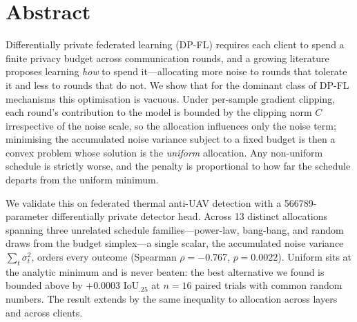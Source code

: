 %
%

\chapter*{Abstract}

Differentially private federated learning (DP-FL) requires each client to spend a
finite privacy budget across communication rounds, and a growing literature
proposes learning \emph{how} to spend it---allocating more noise to rounds that
tolerate it and less to rounds that do not. We show that for the dominant class
of DP-FL mechanisms this optimisation is vacuous. Under per-sample gradient
clipping, each round's contribution to the model is bounded by the clipping norm
$C$ irrespective of the noise scale, so the allocation influences only the noise
term; minimising the accumulated noise variance subject to a fixed budget is then
a convex problem whose solution is the \emph{uniform} allocation. Any non-uniform
schedule is strictly worse, and the penalty is proportional to how far the
schedule departs from the uniform minimum.

We validate this on federated thermal anti-UAV detection with a
\num{566789}-parameter differentially private detector head. Across 13 distinct
allocations spanning three unrelated schedule families---power-law, bang-bang,
and random draws from the budget simplex---a single scalar, the accumulated noise
variance $\sum_t\sigma_t^2$, orders every outcome (Spearman
$\rho=-0.767$, $p=0.0022$). Uniform sits at the analytic minimum and is never
beaten: the best alternative we found is bounded above by $+0.0003$ IoU$_{.25}$
at $n{=}16$ paired trials with common random numbers. The result extends by the
same inequality to allocation across layers and across clients.

